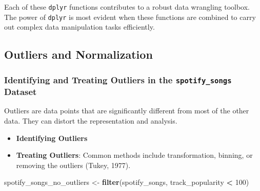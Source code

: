 \documentclass[
]{book}
\newenvironment{Shaded}{\begin{snugshade}}{\end{snugshade}}
\newcommand{\DecValTok}[1]{\textcolor[rgb]{0.00,0.00,0.81}{#1}}
\newcommand{\FunctionTok}[1]{\textcolor[rgb]{0.13,0.29,0.53}{\textbf{#1}}}
\newcommand{\NormalTok}[1]{#1}
\newcommand{\OtherTok}[1]{\textcolor[rgb]{0.56,0.35,0.01}{#1}}
\newcommand{\SpecialCharTok}[1]{\textcolor[rgb]{0.81,0.36,0.00}{\textbf{#1}}}
\providecommand{\tightlist}{%
  \setlength{\itemsep}{0pt}\setlength{\parskip}{0pt}}
\begin{document}
Each of these \texttt{dplyr} functions contributes to a robust data wrangling toolbox. The power of \texttt{dplyr} is most evident when these functions are combined to carry out complex data manipulation tasks efficiently.

\hypertarget{outliers-and-normalization}{%
\subsection*{Outliers and Normalization}\label{outliers-and-normalization}}

\hypertarget{identifying-and-treating-outliers-in-the-spotify_songs-dataset}{%
\subsubsection*{\texorpdfstring{Identifying and Treating Outliers in the \texttt{spotify\_songs} Dataset}{Identifying and Treating Outliers in the spotify\_songs Dataset}}\label{identifying-and-treating-outliers-in-the-spotify_songs-dataset}}

Outliers are data points that are significantly different from most of the other data. They can distort the representation and analysis.

\begin{itemize}
\tightlist
\item
  \textbf{Identifying Outliers}
\end{itemize}

\begin{Shaded}
\end{Shaded}

\begin{itemize}
\tightlist
\item
  \textbf{Treating Outliers}: Common methods include transformation, binning, or removing the outliers (Tukey, 1977).
\end{itemize}

\begin{Shaded}
\begin{Highlighting}[]
\NormalTok{spotify\_songs\_no\_outliers }\OtherTok{\textless{}{-}} \FunctionTok{filter}\NormalTok{(spotify\_songs, track\_popularity }\SpecialCharTok{\textless{}} \DecValTok{100}\NormalTok{)}
\end{Highlighting}
\end{Shaded}
\end{document}
